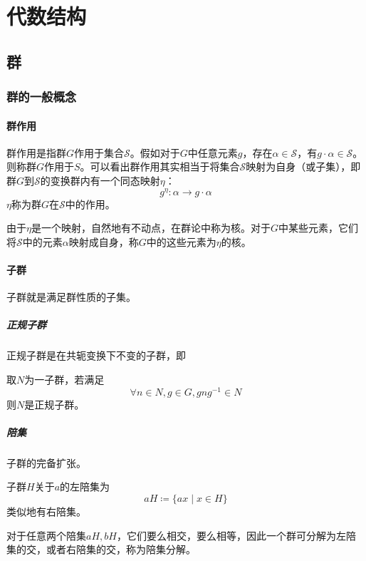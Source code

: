 \chapter{代数结构}



\section{群}
\subsection{群的一般概念}
\subsubsection{群作用}
群作用是指群$G$作用于集合$\mathcal{S}$。假如对于$G$中任意元素$g$，存在$\alpha\in\mathcal{S}$，有$g\cdot \alpha \in \mathcal{S}$。则称群$G$作用于$S$。可以看出群作用其实相当于将集合$\mathcal{S}$映射为自身（或子集），即群$G$到$\mathcal{S}$的变换群内有一个同态映射$\eta$：
$$g^{\eta}\colon \alpha \rightarrow g\cdot \alpha$$
$\eta$称为群$G$在$\mathcal{S}$中的作用。

由于$\eta$是一个映射，自然地有不动点，在群论中称为核。对于$G$中某些元素，它们将$\mathcal{S}$中的元素$\alpha$映射成自身，称$G$中的这些元素为$\eta$的核。

\subsubsection{子群}
子群就是满足群性质的子集。

\paragraph{正规子群}正规子群是在共轭变换下不变的子群，即
\begin{definition}[正规子群]\label{normal-subgroup}
取$N$为一子群，若满足
$$\forall n\in N,g\in G,gng^{-1}\in N$$
则$N$是正规子群。
\end{definition}

\paragraph*{陪集}子群的完备扩张。
\begin{definition}[陪集]
	子群$H$关于$a$的左陪集为
	$$aH\coloneqq\{ax\mid x\in H\}$$
	类似地有右陪集。
\end{definition}
对于任意两个陪集$aH,bH$，它们要么相交，要么相等，因此一个群可分解为左陪集的交，或者右陪集的交，称为陪集分解。

